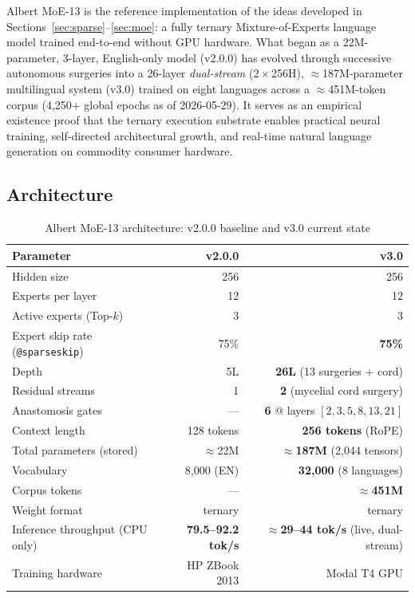 \documentclass[11pt,a4paper]{article}
\begin{document}
Albert MoE-13 is the reference implementation of the ideas developed in
Sections~\ref{sec:sparse}--\ref{sec:moe}: a fully ternary Mixture-of-Experts
language model trained end-to-end without GPU hardware. What began as a
22M-parameter, 3-layer, English-only model (v2.0.0) has evolved through successive
autonomous surgeries into a 26-layer \emph{dual-stream} ($2\times$256H),
$\approx$187M-parameter multilingual system (v3.0) trained on eight languages across a
$\approx$451M-token corpus (4{,}250+ global epochs as of 2026-05-29). It serves as an empirical
existence proof that the ternary execution substrate enables practical neural
training, self-directed architectural growth, and real-time natural language
generation on commodity consumer hardware.

\subsection{Architecture}

\begin{table}[htbp]
\centering
\small
\caption{Albert MoE-13 architecture: v2.0.0 baseline and v3.0 current state}
\label{tab:albert_arch}
\begin{tabular}{lrr}
\toprule
Parameter & v2.0.0 & v3.0 \\
\midrule
Hidden size & 256 & 256 \\
Experts per layer & 12 & 12 \\
Active experts (Top-$k$) & 3 & 3 \\
Expert skip rate (\texttt{@sparseskip}) & 75\% & \textbf{75\%} \\
Depth & 5L & \textbf{26L} (13 surgeries + cord) \\
Residual streams & 1 & \textbf{2} (mycelial cord surgery) \\
Anastomosis gates & --- & \textbf{6} @ layers $[2,3,5,8,13,21]$ \\
Context length & 128 tokens & \textbf{256 tokens} (RoPE) \\
Total parameters (stored) & $\approx$22M & $\approx$\textbf{187M} (2{,}044 tensors) \\
Vocabulary & 8,000 (EN) & \textbf{32,000} (8 languages) \\
Corpus tokens & --- & $\approx$\textbf{451M} \\
Weight format & ternary & ternary \\
Inference throughput (CPU only) & \textbf{79.5--92.2 tok/s} & $\approx$\textbf{29--44 tok/s} (live, dual-stream) \\
Training hardware & HP ZBook 2013 & Modal T4 GPU \\
\bottomrule
\end{tabular}
\end{table}
\end{document}
